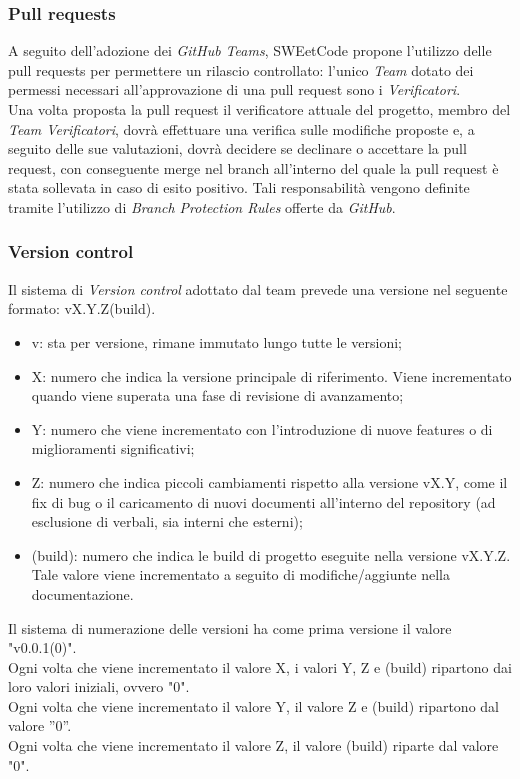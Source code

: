 \documentclass[10pt, a4paper]{article}
\begin{document}
\subsubsection{Pull requests} %
\label{sec:pull_request}
A seguito dell'adozione dei \textit{GitHub Teams}, SWEetCode propone l'utilizzo delle pull requests per permettere un rilascio controllato: l'unico \textit{Team} dotato dei permessi necessari all'approvazione di una pull request sono i \textit{Verificatori}.\\
Una volta proposta la pull request il verificatore attuale del progetto, membro del \textit{Team Verificatori}, dovrà effettuare una verifica sulle modifiche proposte e, a seguito delle sue valutazioni, dovrà decidere se declinare o accettare la pull request, con conseguente merge nel branch all'interno del quale la pull request è stata sollevata in caso di esito positivo.
Tali responsabilità vengono definite tramite l'utilizzo di \textit{Branch Protection Rules} offerte da \textit{GitHub}.

\subsubsection{Version control}
\label{sec:version}
Il sistema di \textit{Version control} adottato dal team prevede una versione nel seguente formato: vX.Y.Z(build).
\begin{itemize}
    \item v: sta per versione, rimane immutato lungo tutte le versioni;
    \item X: numero che indica la versione principale di riferimento. Viene incrementato quando viene superata una fase di revisione di avanzamento;
    \item Y: numero che viene incrementato con l'introduzione di nuove features o di miglioramenti significativi;
    \item Z:  numero che indica piccoli cambiamenti rispetto alla versione vX.Y, come il fix di bug o il caricamento di nuovi documenti all'interno del repository (ad esclusione di verbali, sia interni che esterni);
    \item (build): numero che indica le build di progetto eseguite nella versione vX.Y.Z. Tale valore viene incrementato a seguito di modifiche/aggiunte nella documentazione.
\end{itemize}
Il sistema di numerazione delle versioni ha come prima versione il valore "v0.0.1(0)".\\
Ogni volta che viene incrementato il valore X, i valori Y, Z e (build) ripartono dai loro valori iniziali, ovvero "0".\\
Ogni volta che viene incrementato il valore Y, il valore Z e (build) ripartono dal valore ”0”.\\
Ogni volta che viene incrementato il valore Z, il valore (build) riparte dal valore "0".
\end{document}

